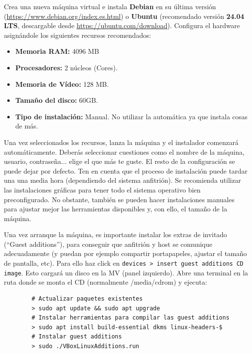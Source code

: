 \documentclass[../main.tex]{subfiles}
\begin{document}
        Crea una nueva máquina virtual e instala \textbf{Debian} en su última versión (\url{https://www.debian.org/index.es.html}) o \textbf{Ubuntu} (recomendado versión \textbf{24.04 LTS}, descargable desde \url{https://ubuntu.com/download}). Configura el hardware asignándole los siguientes recursos recomendados:
        \begin{itemize}
            \item \textbf{Memoria RAM:} 4096 MB
            \item \textbf{Procesadores:} 2 núcleos (Cores).
            \item \textbf{Memoria de Vídeo:} 128 MB.
            \item \textbf{Tamaño del disco:} 60GB.
            \item \textbf{Tipo de instalación:} Manual. No utilizar la automática ya que instala cosas de más.
        \end{itemize}

        Una vez seleccionados los recursos, lanza la máquina y el instalador comenzará automáticamente. Deberás seleccionar cuestiones como el nombre de la máquina, usuario, contraseña... elige el que más te guste. El resto de la configuración se puede dejar por defecto. Ten en cuenta que el proceso de instalación puede tardar una una media hora (dependiendo del sistema anfitrión). Se recomienda utilizar las instalaciones gráficas para tener todo el sistema operativo bien preconfigurado. No obstante, también se pueden hacer instalaciones manuales para ajustar mejor las herramientas disponibles y, con ello, el tamaño de la máquina.

        Una vez arranque la máquina, es importante instalar los extras de invitado (``Guest additions''), para conseguir que anfitrión y host se comunique adecuadamente (y puedan por ejemplo compartir portapapeles, ajustar el tamaño de pantalla, etc). Para ello haz click en \texttt{devices > insert guest additions CD image}. Esto cargará un disco en la MV (panel izquierdo). Abre una terminal en la ruta donde se monta el CD (normalmente /media/cdrom) y ejecuta:

        \begin{lstlisting}
        # Actualizar paquetes existentes
        > sudo apt update && sudo apt upgrade
        # Instalar herramientas para compilar las guest additions
        > sudo apt install build-essential dkms linux-headers-$
        # Instalar guest additions
        > sudo ./VBoxLinuxAdditions.run
        \end{lstlisting}
\end{document}

